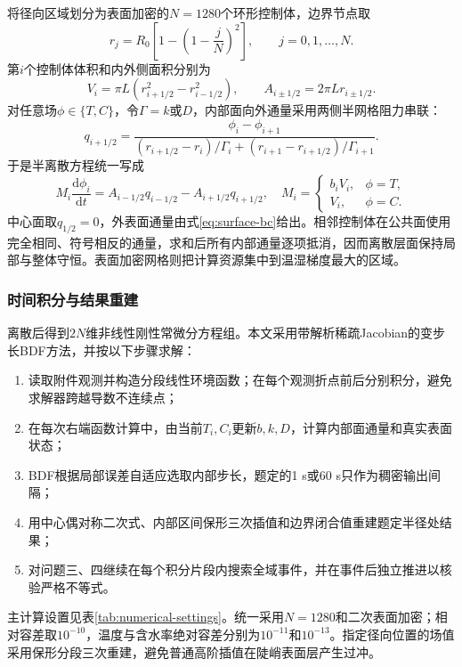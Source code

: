 将径向区域划分为表面加密的$N=1280$个环形控制体，边界节点取
\begin{equation}
 r_j=R_0\left[1-\left(1-\frac{j}{N}\right)^2\right],\qquad j=0,1,\ldots,N.
\end{equation}
第$i$个控制体体积和内外侧面积分别为
\[
V_i=\pi L(r_{i+1/2}^2-r_{i-1/2}^2),\qquad
A_{i\pm1/2}=2\pi Lr_{i\pm1/2}.
\]
对任意场$\phi\in\{T,C\}$，令$\Gamma=k$或$D$，内部面向外通量采用两侧半网格阻力串联：
\begin{equation}
q_{i+1/2}=
\frac{\phi_i-\phi_{i+1}}
{(r_{i+1/2}-r_i)/\Gamma_i+(r_{i+1}-r_{i+1/2})/\Gamma_{i+1}}.
\label{eq:harmonic-flux}
\end{equation}
于是半离散方程统一写成
\begin{equation}
M_i\frac{\mathrm d\phi_i}{\mathrm dt}
=A_{i-1/2}q_{i-1/2}-A_{i+1/2}q_{i+1/2},
\quad
M_i=\begin{cases}b_iV_i,&\phi=T,\\V_i,&\phi=C.\end{cases}
\label{eq:fvm-semidiscrete}
\end{equation}
中心面取$q_{1/2}=0$，外表面通量由式\eqref{eq:surface-bc}给出。相邻控制体在公共面使用完全相同、符号相反的通量，求和后所有内部通量逐项抵消，因而离散层面保持局部与整体守恒。表面加密网格则把计算资源集中到温湿梯度最大的区域。

\subsubsection{时间积分与结果重建}

离散后得到$2N$维非线性刚性常微分方程组。本文采用带解析稀疏Jacobian的变步长BDF方法\cite{virtanen2020}，并按以下步骤求解：
\begin{enumerate}[label=\arabic*)]
  \item 读取附件观测并构造分段线性环境函数；在每个观测折点前后分别积分，避免求解器跨越导数不连续点；
  \item 在每次右端函数计算中，由当前$T_i,C_i$更新$b,k,D$，计算内部面通量和真实表面状态；
  \item BDF根据局部误差自适应选取内部步长，题定的1 s或60 s只作为稠密输出间隔；
  \item 用中心偶对称二次式、内部区间保形三次插值和边界闭合值重建题定半径处结果；
  \item 对问题三、四继续在每个积分片段内搜索全域事件，并在事件后独立推进以核验严格不等式。
\end{enumerate}

主计算设置见表\ref{tab:numerical-settings}。统一采用$N=1280$和二次表面加密；相对容差取$10^{-10}$，温度与含水率绝对容差分别为$10^{-11}$和$10^{-13}$。指定径向位置的场值采用保形分段三次重建，避免普通高阶插值在陡峭表面层产生过冲\cite{fritsch1980}。

